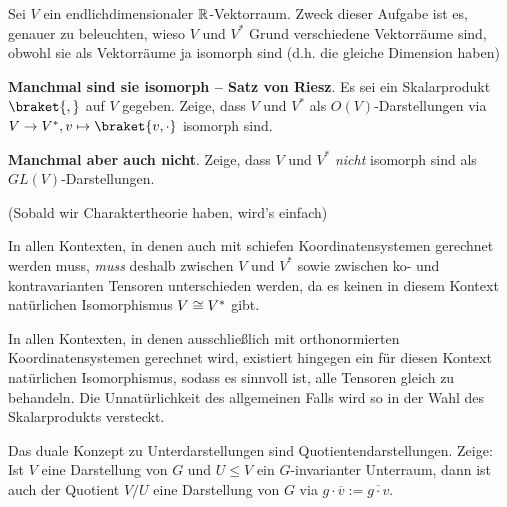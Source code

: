 \begin{sheet}
\begin{problem}[title={(Nicht-)Isomorphie von $V$ und $V^\ast$}]
Sei $V$ ein endlichdimensionaler $\mathbb{R}$-Vektorraum. Zweck dieser Aufgabe ist es, genauer zu beleuchten, wieso $V$ und $V^\ast$ Grund verschiedene Vektorräume sind, obwohl sie als Vektorräume ja isomorph sind (d.h. die gleiche Dimension haben)
\begin{subproblem}
\textbf{Manchmal sind sie isomorph -- Satz von Riesz}.
Es sei ein Skalarprodukt $\braket{,}$ auf $V$ gegeben. Zeige, dass $V$ und $V^\ast$ als $O(V)$-Darstellungen via $V\to V^\ast, v\mapsto \braket{v,\cdot}$ isomorph sind.
\end{subproblem}
\begin{subproblem}[difficulty={schwerer als man denkt}]
\textbf{Manchmal aber auch nicht}.
Zeige, dass $V$ und $V^\ast$ \emph{nicht} isomorph sind als $GL(V)$-Darstellungen.

(Sobald wir Charaktertheorie haben, wird's einfach)
\end{subproblem}
\end{problem}

\begin{remark}
In allen Kontexten, in denen auch mit schiefen Koordinatensystemen gerechnet werden muss, \emph{muss} deshalb zwischen $V$ und $V^\ast$ sowie zwischen ko- und kontravarianten Tensoren unterschieden werden, da es keinen in diesem Kontext natürlichen Isomorphismus $V\cong V^\ast$ gibt.

In allen Kontexten, in denen ausschließlich mit orthonormierten Koordinatensystemen gerechnet wird, existiert hingegen ein für diesen Kontext natürlichen Isomorphismus, sodass es sinnvoll ist, alle Tensoren gleich zu behandeln. Die Unnatürlichkeit des allgemeinen Falls wird so in der Wahl des Skalarprodukts versteckt.
\end{remark}

\begin{problem}[title={Quotienten}]
Das duale Konzept zu Unterdarstellungen sind Quotientendarstellungen. Zeige: Ist $V$ eine Darstellung von $G$ und $U\leq V$ ein $G$-invarianter Unterraum, dann ist auch der Quotient $V/U$ eine Darstellung von $G$ via $g\cdot\overline{v} := \overline{g\cdot v}$.
\end{problem}
	
\end{sheet}